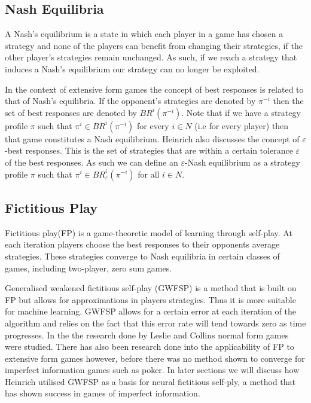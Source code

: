 \subsection{Nash Equilibria}\label{subsec:nashEquilibria}
A Nash's equilibrium is a state in which each player in a game has chosen a strategy and
none of the players can benefit from changing their strategies, if the other player's strategies remain unchanged.
As such, if we reach a strategy that induces a Nash's equilibrium our strategy can no longer be exploited.

In the context of extensive form games the concept of best responses is related to that of Nash's equilibria.
If the opponent's strategies are denoted by $\pi^{-i}$ then the set of best responses are denoted by
$BR^i(\pi^{-i})$.
Note that if we have a strategy profile $\pi$ such that $\pi^i\in BR^i(\pi^{-i})$ for every $i\in N$ (i.e
for every player) then that game constitutes a Nash equilibrium\citep{heinrich2017reinforcement}.
Heinrich also discusses the concept of $\varepsilon$-best responses.
This is the set of strategies that are within a certain tolerance $\varepsilon$ of the best responses.
As such we can define an $\varepsilon$-Nash equilibrium as a strategy profile $\pi$ such that
$\pi^i \in BR^i_\varepsilon (\pi^{-i})$ for all $i\in N$.

\subsection{Fictitious Play}\label{subsec:fictitiousPlay}
Fictitious play(FP) is a game-theoretic model of learning through self-play.
At each iteration players choose the best responses to their opponents average
strategies\citep{heinrich2017reinforcement}.
These strategies converge to Nash equilibria in certain classes of games, including two-player, zero sum games.

Generalised weakened fictitious self-play (GWFSP) is a method that is built on FP but allows for approximations
in players strategies\citep{leslie2006generalised}.
Thus it is more suitable for machine learning.
GWFSP allows for a certain error at each iteration of the algorithm and relies on the fact that this
error rate will tend towards zero as time progresses.
In the the research done by Leslie and Collins normal form games were studied.
There has also been research done into the applicability of FP to extensive form games however,
before\citep{heinrich2016deep} there was no method shown to converge for imperfect information games such as poker.
In later sections we will discuss how Heinrich utilised GWFSP as a basis for neural fictitious self-ply,
a method that has shown success in games of imperfect information.

